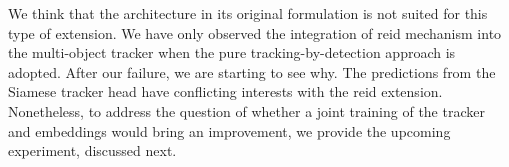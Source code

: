 We think that the architecture in its original formulation is not suited for this type of extension. We have only observed the integration of \gls{reid} mechanism into the multi-object tracker when the pure tracking-by-detection approach is adopted. After our failure, we are starting to see why. The predictions from the Siamese tracker head have conflicting interests with the \gls{reid} extension. Nonetheless, to address the question of whether a joint training of the tracker and embeddings would bring an improvement, we provide the upcoming experiment, discussed next.

